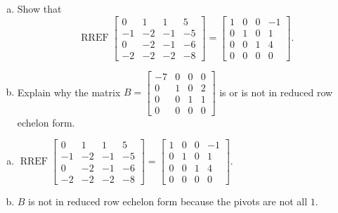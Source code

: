 
\begin{exerciseStatement}

\begin{enumerate}[(a)]
\item Show that \[\operatorname{RREF} \left[\begin{array}{cccc}
0 & 1 & 1 & 5 \\
-1 & -2 & -1 & -5 \\
0 & -2 & -1 & -6 \\
-2 & -2 & -2 & -8
\end{array}\right] = \left[\begin{array}{cccc}
1 & 0 & 0 & -1 \\
0 & 1 & 0 & 1 \\
0 & 0 & 1 & 4 \\
0 & 0 & 0 & 0
\end{array}\right] .\]
\item Explain why the matrix \(B= \left[\begin{array}{cccc}
-7 & 0 & 0 & 0 \\
0 & 1 & 0 & 2 \\
0 & 0 & 1 & 1 \\
0 & 0 & 0 & 0
\end{array}\right] \) is or is not in reduced row echelon form.
\end{enumerate}
    
\end{exerciseStatement}
    
\begin{exerciseAnswer} 

\begin{enumerate}[(a)]
\item \(\operatorname{RREF} \left[\begin{array}{cccc}
0 & 1 & 1 & 5 \\
-1 & -2 & -1 & -5 \\
0 & -2 & -1 & -6 \\
-2 & -2 & -2 & -8
\end{array}\right] = \left[\begin{array}{cccc}
1 & 0 & 0 & -1 \\
0 & 1 & 0 & 1 \\
0 & 0 & 1 & 4 \\
0 & 0 & 0 & 0
\end{array}\right] .\)
\item \(B\) is not in reduced row echelon form because the pivots are not all \(1\). 
\end{enumerate}
    
\end{exerciseAnswer}
    
